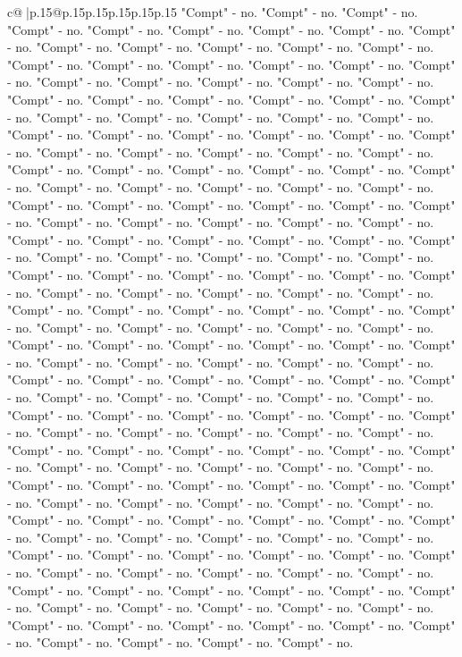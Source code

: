 \documentclass{article}
\begin{document}
{\begin{supertabular}{c@{$\;$}|p{.15\linewidth}@{}p{.15\linewidth}p{.15\linewidth}p{.15\linewidth}p{.15\linewidth}p{.15\linewidth}}
{{{"Compt" {-} no. "Compt" {-} no. "Compt" {-} no. "Compt" {-} no. "Compt" {-} no. "Compt" {-} no. "Compt" {-} no. "Compt" {-} no. "Compt" {-} no. "Compt" {-} no. "Compt" {-} no. "Compt" {-} no. "Compt" {-} no. "Compt" {-} no. "Compt" {-} no. "Compt" {-} no. "Compt" {-} no. "Compt" {-} no. "Compt" {-} no. "Compt" {-} no. "Compt" {-} no. "Compt" {-} no. "Compt" {-} no. "Compt" {-} no. "Compt" {-} no. "Compt" {-} no. "Compt" {-} no. "Compt" {-} no. "Compt" {-} no. "Compt" {-} no. "Compt" {-} no. "Compt" {-} no. "Compt" {-} no. "Compt" {-} no. "Compt" {-} no. "Compt" {-} no. "Compt" {-} no. "Compt" {-} no. "Compt" {-} no. "Compt" {-} no. "Compt" {-} no. "Compt" {-} no. "Compt" {-} no. "Compt" {-} no. "Compt" {-} no. "Compt" {-} no. "Compt" {-} no. "Compt" {-} no. "Compt" {-} no. "Compt" {-} no. "Compt" {-} no. "Compt" {-} no. "Compt" {-} no. "Compt" {-} no. "Compt" {-} no. "Compt" {-} no. "Compt" {-} no. "Compt" {-} no. "Compt" {-} no. "Compt" {-} no. "Compt" {-} no. "Compt" {-} no. "Compt" {-} no. "Compt" {-} no. "Compt" {-} no. "Compt" {-} no. "Compt" {-} no. "Compt" {-} no. "Compt" {-} no. "Compt" {-} no. "Compt" {-} no. "Compt" {-} no. "Compt" {-} no. "Compt" {-} no. "Compt" {-} no. "Compt" {-} no. "Compt" {-} no. "Compt" {-} no. "Compt" {-} no. "Compt" {-} no. "Compt" {-} no. "Compt" {-} no. "Compt" {-} no. "Compt" {-} no. "Compt" {-} no. "Compt" {-} no. "Compt" {-} no. "Compt" {-} no. "Compt" {-} no. "Compt" {-} no. "Compt" {-} no. "Compt" {-} no. "Compt" {-} no. "Compt" {-} no. "Compt" {-} no. "Compt" {-} no. "Compt" {-} no. "Compt" {-} no. "Compt" {-} no. "Compt" {-} no. "Compt" {-} no. "Compt" {-} no. "Compt" {-} no. "Compt" {-} no. "Compt" {-} no. "Compt" {-} no. "Compt" {-} no. "Compt" {-} no. "Compt" {-} no. "Compt" {-} no. "Compt" {-} no. "Compt" {-} no. "Compt" {-} no. "Compt" {-} no. "Compt" {-} no. "Compt" {-} no. "Compt" {-} no. "Compt" {-} no. "Compt" {-} no. "Compt" {-} no. "Compt" {-} no. "Compt" {-} no. "Compt" {-} no. "Compt" {-} no. "Compt" {-} no. "Compt" {-} no. "Compt" {-} no. "Compt" {-} no. "Compt" {-} no. "Compt" {-} no. "Compt" {-} no. "Compt" {-} no. "Compt" {-} no. "Compt" {-} no. "Compt" {-} no. "Compt" {-} no. "Compt" {-} no. "Compt" {-} no. "Compt" {-} no. "Compt" {-} no. "Compt" {-} no. "Compt" {-} no. "Compt" {-} no. "Compt" {-} no. "Compt" {-} no. "Compt" {-} no. "Compt" {-} no. "Compt" {-} no. "Compt" {-} no. "Compt" {-} no. "Compt" {-} no. "Compt" {-} no. "Compt" {-} no. "Compt" {-} no. "Compt" {-} no. "Compt" {-} no. "Compt" {-} no. "Compt" {-} no. "Compt" {-} no. "Compt" {-} no. "Compt" {-} no. "Compt" {-} no. "Compt" {-} no. "Compt" {-} no. "Compt" {-} no. "Compt" {-} no. "Compt" {-} no. "Compt" {-} no. "Compt" {-} no. "Compt" {-} no. "Compt" {-} no. "Compt" {-} no. "Compt" {-} no. "Compt" {-} no. "Compt" {-} no. "Compt" {-} no. "Compt" {-} no. "Compt" {-} no. "Compt" {-} no. "Compt" {-} no. "Compt" {-} no. "Compt" {-} no. "Compt" {-} no. "Compt" {-} no. "Compt" {-} no. "Compt" {-} no. "Compt" {-} no. "Compt" {-} no. "Compt" {-} no. "Compt" {-} no. "Compt" {-} no. "Compt" {-} no. "Compt" {-} no. "Compt" {-} no. "Compt" {-} no. "Compt" {-} no. "Compt" {-} no. "Compt" {-} no. "Compt" {-} no. "Compt" {-} no. }}}
\end{supertabular}}
\end{document}
